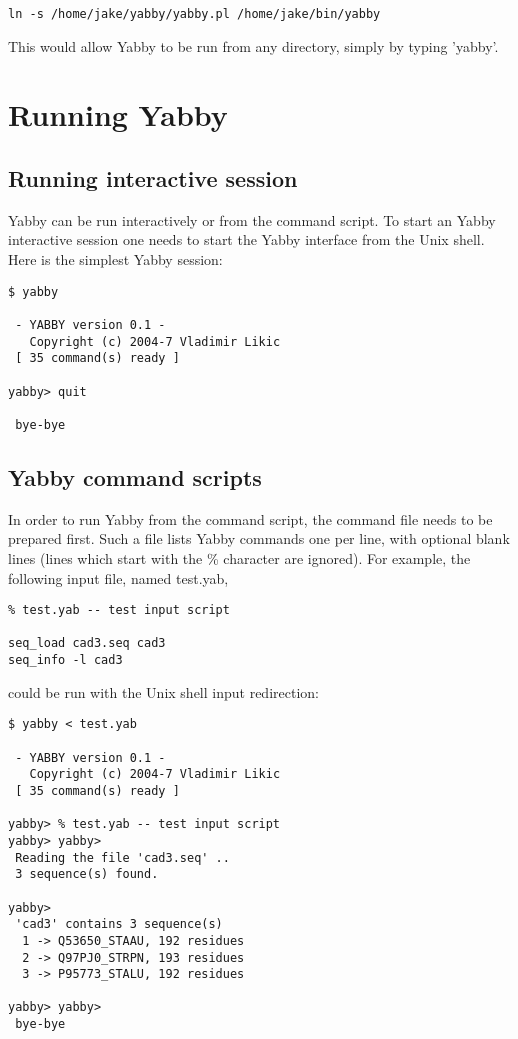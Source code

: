 \begin{verbatim}
ln -s /home/jake/yabby/yabby.pl /home/jake/bin/yabby
\end{verbatim}

This would allow Yabby to be run from any directory, simply by
typing 'yabby'.

\section{Running Yabby}

\subsection{Running interactive session}

Yabby can be run interactively or from the command script. To
start an Yabby interactive session one needs to start the Yabby
interface from the Unix shell. Here is the simplest Yabby session:

\begin{verbatim}
$ yabby

 - YABBY version 0.1 - 
   Copyright (c) 2004-7 Vladimir Likic
 [ 35 command(s) ready ]

yabby> quit

 bye-bye
\end{verbatim}

\subsection{Yabby command scripts}

In order to run Yabby from the command script, the command file
needs to be prepared first. Such a file lists Yabby commands
one per line, with optional blank lines (lines which start with
the \% character are ignored). For example, the following input
file, named test.yab,

\begin{verbatim}
% test.yab -- test input script

seq_load cad3.seq cad3
seq_info -l cad3
\end{verbatim}

could be run with the Unix shell input redirection:

\begin{verbatim}
$ yabby < test.yab

 - YABBY version 0.1 - 
   Copyright (c) 2004-7 Vladimir Likic
 [ 35 command(s) ready ]

yabby> % test.yab -- test input script
yabby> yabby> 
 Reading the file 'cad3.seq' ..
 3 sequence(s) found.

yabby> 
 'cad3' contains 3 sequence(s)
  1 -> Q53650_STAAU, 192 residues
  2 -> Q97PJ0_STRPN, 193 residues
  3 -> P95773_STALU, 192 residues

yabby> yabby> 
 bye-bye
\end{verbatim}

